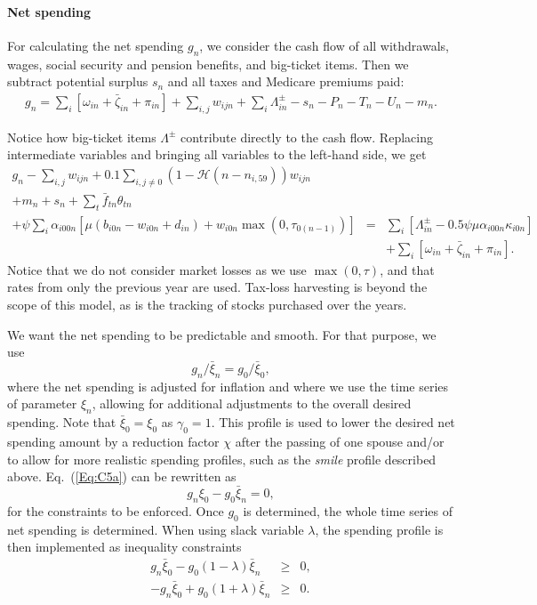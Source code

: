 \documentclass{report}[fleqn,11pt]
\begin{document}
\paragraph*{Net spending}
	For calculating the net spending $g_n$, we consider the cash flow of all withdrawals,
	wages, social security and pension benefits, and big-ticket items. 
	Then we subtract potential surplus $s_{n}$ and all taxes and Medicare premiums paid:
	\begin{eqnarray}
		g_n = \sum_i [\omega_{in} + \bar{\zeta}_{in} + \pi_{in} ] 
		+ \sum_{i,j} w_{ijn} + \sum_i \Lambda^\pm_{in} - s_{n}
		- P_n - T_n - U_n - m_n.
	\end{eqnarray}

	Notice how big-ticket items $\Lambda^\pm$ contribute directly to the cash flow.
	Replacing intermediate variables and bringing all variables to the left-hand side, we get
	\begin{eqnarray}
		\label{Eq:C4}
		g_n - \sum_{i,j} w_{ijn} + 0.1 \sum_{i,j\neq0} (1-\mathcal{H}(n - n_{i, 59})) w_{ijn}\nonumber\\
                + m_n + s_n + \sum_t \bar{f}_{tn} \theta_{t n} &&\nonumber \\
		+ \psi\sum_i \alpha_{i00n} \left[\mu(b_{i0n} - w_{i0n} + d_{in})
		+ w_{i0n}\max(0, \tau_{0(n-1)})\right] 
		&=& \sum_i [\Lambda^\pm_{in} - 0.5\psi\mu\alpha_{i00n}\kappa_{i0n}] \nonumber\\
                && + \sum_i [\omega_{in} + \bar{\zeta}_{in} + \pi_{in} ].
	\end{eqnarray}
	Notice that we do not consider market losses as we use $\max(0, \tau)$, and that
	rates from only the previous year are used. Tax-loss
	harvesting is beyond the scope of this model, as is the tracking of stocks
	purchased over the years.

	We want the net spending to be predictable and smooth. For that purpose, we use
\begin{equation}
	\label{Eq:C5a}
	g_{n}/\bar{\xi}_{n} = g_0/\bar{\xi}_0,
\end{equation}
where the net spending is adjusted for inflation and where we use the time series of parameter $\xi_n$,
allowing for additional adjustments to the overall desired spending.
Note that $\bar{\xi}_0 = \xi_0$ as $\gamma_0=1$.
This profile is used to lower the desired net spending amount by a reduction factor $\chi$
after the passing of one spouse and/or to allow for more realistic spending profiles, such as
the {\em smile} profile described above.
Eq.~(\ref{Eq:C5a}) can be rewritten as
\begin{equation}
	\label{Eq:C5}
	g_n \xi_0 - g_0 \bar{\xi}_n = 0,
\end{equation}
for the constraints to be enforced. Once $g_0$ is determined, the whole time series of net spending
is determined.
When using slack variable $\lambda$, the spending profile is then implemented as inequality constraints
\begin{eqnarray}
	\label{Eq:lambdha}
	g_n \bar{\xi}_0 - g_0 (1 - \lambda) \bar{\xi}_n &\geq&  0, \nonumber\\
	-g_n \bar{\xi}_0 + g_0 (1 + \lambda) \bar{\xi}_n &\geq&  0.
\end{eqnarray}
\end{document}
